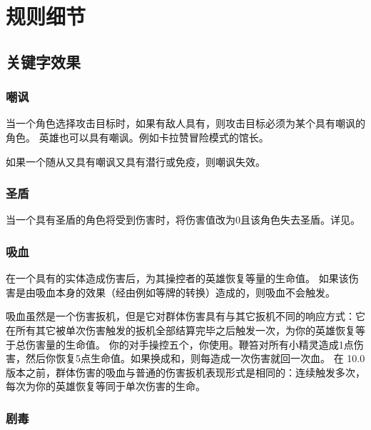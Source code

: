 \chapter{规则细节}
\label{rule-detail}

\setcounter{tocdepth}{2}
\section{关键字效果}
\label{keyword}

\subsection{嘲讽}
\label{taunt}

当一个角色选择攻击目标时，如果有敌人具有，则攻击目标必须为某个具有嘲讽的角色。
\notice 英雄也可以具有嘲讽。例如卡拉赞冒险模式的馆长。

如果一个随从又具有嘲讽又具有潜行或免疫，则嘲讽失效。

\subsection{圣盾}
\label{divine-shield}

当一个具有圣盾的角色将受到伤害时，将伤害值改为0且该角色失去圣盾。详见。

\subsection{吸血}
\label{lifesteal}

在一个具有的实体造成伤害后，为其操控者的英雄恢复等量的生命值。
\notice 如果该伤害是由吸血本身的效果（经由例如等牌的转换）造成的，则吸血不会触发。

 吸血虽然是一个伤害扳机，但是它对群体伤害具有与其它扳机不同的响应方式：它在所有其它被单次伤害触发的扳机全部结算完毕之后触发一次，为你的英雄恢复等于总伤害量的生命值。
\example 你的对手操控五个，你使用。鞭笞对所有小精灵造成1点伤害，然后你恢复5点生命值。如果换成和，则每造成一次伤害就回一次血。
\notice 在 10.0 版本之前，群体伤害的吸血与普通的伤害扳机表现形式是相同的：连续触发多次，每次为你的英雄恢复等同于单次伤害的生命。

\subsection{剧毒}
\label{poisonous}

